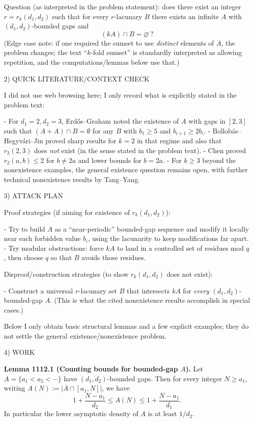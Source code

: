 Question (as interpreted in the problem statement): does there exist an integer \(r=r_k(d_1,d_2)\) such that for every \(r\)-lacunary \(B\) there exists an infinite \(A\) with \((d_1,d_2)\)-bounded gaps and
\[
 (kA)\cap B = \varnothing\ ?
\]
(Edge case note: if one required the sumset to use \emph{distinct} elements of \(A\), the problem changes; the text ``\(k\)-fold sumset'' is standardly interpreted as allowing repetition, and the computations/lemmas below use that.)

2) QUICK LITERATURE/CONTEXT CHECK

I did not use web browsing here; I only record what is explicitly stated in the problem text:

- For \(d_1=2,d_2=3\), Erd\H{o}s--Graham noted the existence of \(A\) with gaps in \([2,3]\) such that \((A+A)\cap B=\emptyset\) for any \(B\) with \(b_{1}\ge 5\) and \(b_{i+1}\ge 2b_i\).
- Bollob\'as--Hegyv\'ari--Jin proved sharp results for \(k=2\) in that regime and also that \(r_3(2,3)\) does \emph{not} exist (in the sense stated in the problem text).
- Chen proved \(r_2(a,b)\le 2\) for \(b\ne 2a\) and lower bounds for \(b=2a\).
- For \(k\ge 3\) beyond the nonexistence examples, the general existence question remains open, with further technical nonexistence results by Tang--Yang.

3) ATTACK PLAN

Proof strategies (if aiming for existence of \(r_k(d_1,d_2)\)):

- Try to build \(A\) as a ``near-periodic'' bounded-gap sequence and modify it locally near each forbidden value \(b_i\), using the lacunarity to keep modifications far apart.
- Try modular obstructions: force \(kA\) to land in a controlled set of residues mod \(q\), then choose \(q\) so that \(B\) avoids those residues.

Disproof/construction strategies (to show \(r_k(d_1,d_2)\) does not exist):

- Construct a universal \(r\)-lacunary set \(B\) that intersects \(kA\) for \emph{every} \((d_1,d_2)\)-bounded-gap \(A\). (This is what the cited nonexistence results accomplish in special cases.)

Below I only obtain basic structural lemmas and a few explicit examples; they do not settle the general existence/nonexistence problem.

4) WORK

\textbf{Lemma 1112.1 (Counting bounds for bounded-gap \(A\)).}
Let \(A=\{a_1<a_2<\cdots\}\) have \((d_1,d_2)\)-bounded gaps.  Then for every integer \(N\ge a_1\), writing \(A(N):=|A\cap [a_1,N]|\), we have
\[
 1+\frac{N-a_1}{d_2} \le A(N) \le 1+\frac{N-a_1}{d_1}.
\]
In particular the lower asymptotic density of \(A\) is at least \(1/d_2\).

